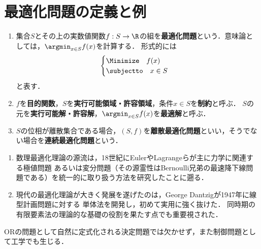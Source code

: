 \documentclass[uplatex,dvipdfmx]{jsreport}
\begin{document}
\section{最適化問題の定義と例}

\begin{definition}\mbox{}
    \begin{enumerate}
        \item 集合$S$とその上の実数値関数$f:S\to\R$の組を\textbf{最適化問題}という．意味論としては，$\argmin_{x\in S}f(x)$を計算する．
        形式的には
        \[\begin{cases}
            \Minimize\quad f(x)\\
            \subjectto\quad x\in S
        \end{cases}\]
        と表す．
        \item $f$を\textbf{目的関数}，$S$を\textbf{実行可能領域・許容領域}，条件$x\in S$を\textbf{制約}と呼ぶ．
        $S$の元を\textbf{実行可能解・許容解}，$\argmin_{x\in S}f(x)$を\textbf{最適解}と呼ぶ．
        \item $S$の位相が離散集合である場合，$(S,f)$を\textbf{離散最適化問題}といい，そうでない場合を\textbf{連続最適化問題}という．
    \end{enumerate}
\end{definition}

\begin{example}[輸送問題]
    
\end{example}


\begin{history}[ORの華になるまで]\mbox{}
    \begin{enumerate}
        \item 数理最適化理論の源流は，18世紀にEulerやLagrangeらが主に力学に関連する極値問題
        あるいは変分問題（その源霊性はBernoulli兄弟の最速降下線問題である）を統一的に取り扱う方法を研究したことに遡る．
        \item 現代の最適化理論が大きく発展を遂げたのは，George Dantzigが1947年に線型計画問題に対する
        単体法を開発し，初めて実用に強く抜けた．
        同時期の有限要素法の理論的な基礎の役割を果たす点でも重要視された．
    \end{enumerate}
    ORの問題として自然に定式化される決定問題では欠かせず，また制御問題として工学でも生じる．
\end{history}
\end{document}
